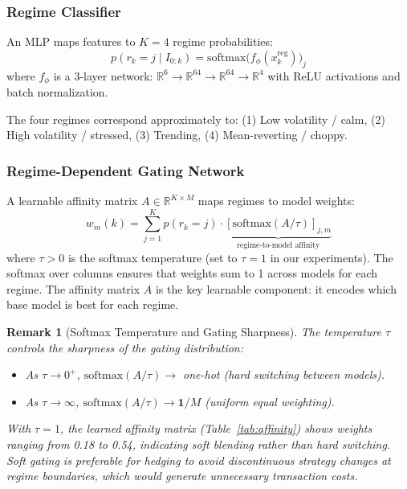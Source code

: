 \documentclass[11pt,oneside]{report}
\newcommand{\R}{\mathbb{R}}
\newtheorem{remark}{Remark}[chapter]
\begin{document}
\subsubsection{Regime Classifier}

An MLP maps features to $K = 4$ regime probabilities:
\begin{equation}
    p(r_k = j \mid I_{0:k}) = \mathrm{softmax}\bigl(f_\phi(x_k^{\mathrm{reg}})\bigr)_j
\end{equation}
where $f_\phi$ is a 3-layer network: $\R^6 \to \R^{64} \to \R^{64} \to \R^4$ with ReLU activations and batch normalization.

The four regimes correspond approximately to: (1) Low volatility / calm, (2) High volatility / stressed, (3) Trending, (4) Mean-reverting / choppy.

\subsubsection{Regime-Dependent Gating Network}

A learnable affinity matrix $A \in \R^{K \times M}$ maps regimes to model weights:
\begin{equation}
    w_m(k) = \sum_{j=1}^{K} p(r_k = j) \cdot \underbrace{[\mathrm{softmax}(A/\tau)]_{j,m}}_{\text{regime-to-model affinity}}
    \label{eq:gating}
\end{equation}
where $\tau > 0$ is the softmax temperature (set to $\tau = 1$ in our experiments).  The softmax over columns ensures that weights sum to 1 across models for each regime.  The affinity matrix $A$ is the key learnable component: it encodes which base model is best for each regime.

\begin{remark}[Softmax Temperature and Gating Sharpness]
The temperature $\tau$ controls the sharpness of the gating distribution:
\begin{itemize}[noitemsep]
    \item As $\tau \to 0^+$, $\mathrm{softmax}(A/\tau) \to$ one-hot (hard switching between models).
    \item As $\tau \to \infty$, $\mathrm{softmax}(A/\tau) \to \mathbf{1}/M$ (uniform equal weighting).
\end{itemize}
With $\tau = 1$, the learned affinity matrix (Table~\ref{tab:affinity}) shows weights ranging from 0.18 to 0.54, indicating soft blending rather than hard switching.  Soft gating is preferable for hedging to avoid discontinuous strategy changes at regime boundaries, which would generate unnecessary transaction costs.
\end{remark}
\end{document}
